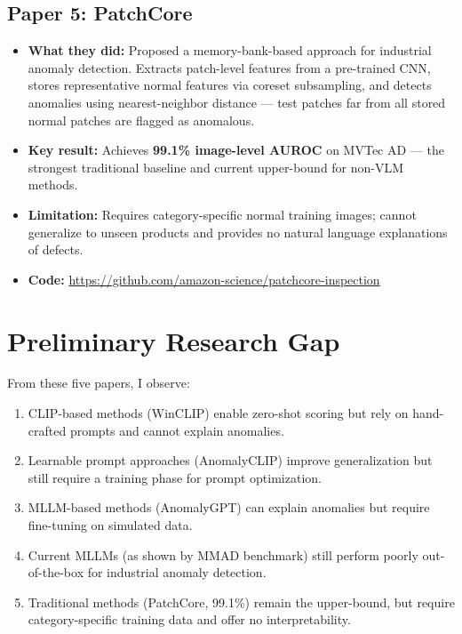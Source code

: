 \documentclass[12pt, a4paper]{article}
\begin{document}
\subsection{Paper 5: PatchCore \cite{roth2022patchcore}}
\begin{itemize}[leftmargin=*]
    \item \textbf{What they did:} Proposed a memory-bank-based approach for industrial anomaly detection. Extracts patch-level features from a pre-trained CNN, stores representative normal features via coreset subsampling, and detects anomalies using nearest-neighbor distance --- test patches far from all stored normal patches are flagged as anomalous.
    \item \textbf{Key result:} Achieves \textbf{99.1\% image-level AUROC} on MVTec AD --- the strongest traditional baseline and current upper-bound for non-VLM methods.
    \item \textbf{Limitation:} Requires category-specific normal training images; cannot generalize to unseen products and provides no natural language explanations of defects.
    \item \textbf{Code:} \url{https://github.com/amazon-science/patchcore-inspection}
\end{itemize}

\section{Preliminary Research Gap}

From these five papers, I observe:
\begin{enumerate}[leftmargin=*]
    \item CLIP-based methods (WinCLIP) enable zero-shot scoring but rely on hand-crafted prompts and cannot explain anomalies.
    \item Learnable prompt approaches (AnomalyCLIP) improve generalization but still require a training phase for prompt optimization.
    \item MLLM-based methods (AnomalyGPT) can explain anomalies but require fine-tuning on simulated data.
    \item Current MLLMs (as shown by MMAD benchmark) still perform poorly out-of-the-box for industrial anomaly detection.
    \item Traditional methods (PatchCore, 99.1\%) remain the upper-bound, but require category-specific training data and offer no interpretability.
\end{enumerate}
\end{document}
